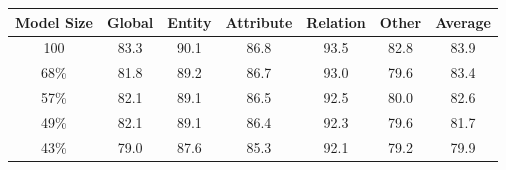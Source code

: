 \begin{table}[H]
	\centering
	{%
		
		\begin{tabular}{ccccccc}
			\toprule
			\multicolumn{1}{c}{\textbf{Model Size}} &
			\multicolumn{1}{c}{Global} &
			\multicolumn{1}{c}{Entity} &
			\multicolumn{1}{c}{Attribute} &
			\multicolumn{1}{c}{Relation} &
			\multicolumn{1}{c}{Other} &
			\multicolumn{1}{c}{Average}\\
			\midrule
			\color{gray} 100  %
			& \color{gray} 83.3  %
			& \color{gray} 90.1  %
			& \color{gray} 86.8  %
			& \color{gray} 93.5  %
			& \color{gray} 82.8  %
			& \color{gray} 83.9  %
			\\
			\midrule

%		
	
			68\% &    %
			81.8 &    %
			89.2 &    %
			86.7 &    %
			93.0 &    %
			79.6 &    %
			83.4     %
			\\
		
			57\% &    %
			82.1 &    %
			89.1 &    %
			86.5 &    %
			92.5 &    %
			80.0 &    %
			82.6    %
			\\

			49\% &    %
			82.1 &    %
			89.1 &    %
			86.4 &    %
			92.3 &    %
			79.6 &    %
			81.7    %
			\\
	
			43\% &    %
			79.0 &    %
			87.6 &    %
			85.3 &    %
			92.1 &    %
			79.2 &    %
			79.9     %
			\\
			

\end{tabular}}
\end{table}

